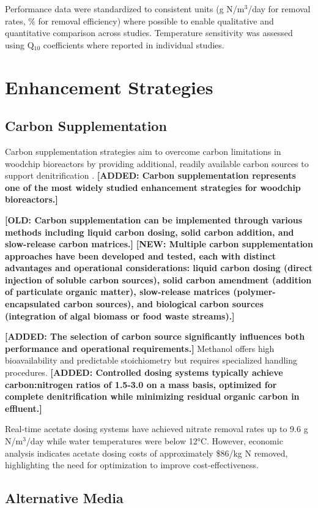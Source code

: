 \documentclass[12pt,a4paper]{article}
\newcommand{\added}[1]{\textcolor{addedtext}{\textbf{[ADDED: #1]}}}
\newcommand{\replaced}[2]{\textcolor{deletedtext}{\textbf{[OLD: #1]}} \textcolor{replacedtext}{\textbf{[NEW: #2]}}}
\begin{document}
Performance data were standardized to consistent units (g N/m$^3$/day for removal rates, \% for removal efficiency) where possible to enable qualitative and quantitative comparison across studies. Temperature sensitivity was assessed using Q$_{10}$ coefficients where reported in individual studies.

\section{Enhancement Strategies}

\subsection{Carbon Supplementation}

Carbon supplementation strategies aim to overcome carbon limitations in woodchip bioreactors by providing additional, readily available carbon sources to support denitrification \citep{RN242, RN258}. \added{Carbon supplementation represents one of the most widely studied enhancement strategies for woodchip bioreactors.}

\replaced{Carbon supplementation can be implemented through various methods including liquid carbon dosing, solid carbon addition, and slow-release carbon matrices.}{Multiple carbon supplementation approaches have been developed and tested, each with distinct advantages and operational considerations: liquid carbon dosing (direct injection of soluble carbon sources), solid carbon amendment (addition of particulate organic matter), slow-release matrices (polymer-encapsulated carbon sources), and biological carbon sources (integration of algal biomass or food waste streams).}

\added{The selection of carbon source significantly influences both performance and operational requirements.} Methanol offers high bioavailability and predictable stoichiometry but requires specialized handling procedures. \added{Controlled dosing systems typically achieve carbon:nitrogen ratios of 1.5-3.0 on a mass basis, optimized for complete denitrification while minimizing residual organic carbon in effluent.}

Real-time acetate dosing systems have achieved nitrate removal rates up to 9.6 g N/m$^3$/day while water temperatures were below 12°C. However, economic analysis indicates acetate dosing costs of approximately \$86/kg N removed, highlighting the need for optimization to improve cost-effectiveness.

\subsection{Alternative Media}
\end{document}
